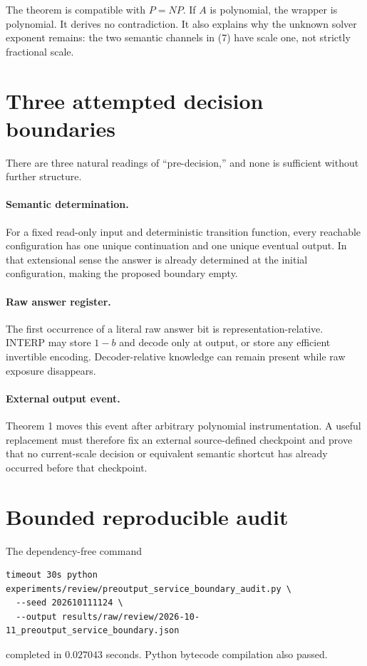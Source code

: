 \documentclass[11pt]{article}
\begin{document}
The theorem is compatible with $P=NP$.  If $A$ is polynomial, the wrapper is
polynomial.  It derives no contradiction.  It also explains why the unknown
solver exponent remains: the two semantic channels in (7) have scale one,
not strictly fractional scale.

\section{Three attempted decision boundaries}

There are three natural readings of ``pre-decision,'' and none is sufficient
without further structure.

\paragraph{Semantic determination.}
For a fixed read-only input and deterministic transition function, every
reachable configuration has one unique continuation and one unique eventual
output.  In that extensional sense the answer is already determined at the
initial configuration, making the proposed boundary empty.

\paragraph{Raw answer register.}
The first occurrence of a literal raw answer bit is representation-relative.
INTERP may store $1-b$ and decode only at output, or store any efficient
invertible encoding.  Decoder-relative knowledge can remain present while raw
exposure disappears.

\paragraph{External output event.}
Theorem 1 moves this event after arbitrary polynomial instrumentation.  A
useful replacement must therefore fix an external source-defined checkpoint
and prove that no current-scale decision or equivalent semantic shortcut has
already occurred before that checkpoint.

\section{Bounded reproducible audit}

The dependency-free command
\begin{verbatim}
timeout 30s python experiments/review/preoutput_service_boundary_audit.py \
  --seed 202610111124 \
  --output results/raw/review/2026-10-11_preoutput_service_boundary.json
\end{verbatim}
completed in $0.027043$ seconds.  Python bytecode compilation also passed.
\end{document}
